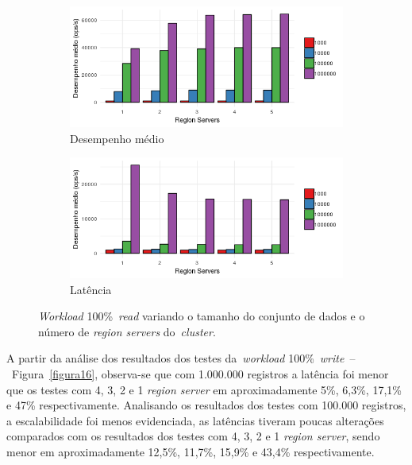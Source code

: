\documentclass[12pt]{article}
\begin{document}
\begin{figure}[!ht]
    \centering
    \begin{subfigure}[b]{0.49\textwidth}
        \centering
        \includegraphics[width=\textwidth]{images/figura17}
        \caption{Desempenho médio}
        \label{figura17}
    \end{subfigure}
        \hfill
    \begin{subfigure}[b]{0.49\textwidth}  
        \centering 
        \includegraphics[width=\textwidth]{images/figura18}
        \caption{Latência}%
        \label{figura18}
    \end{subfigure}
    \caption{\emph{Workload} 100\%~\emph{read} variando o tamanho do conjunto de dados e o número de \emph{region servers} do~\emph{cluster}.}
\end{figure}

A partir da análise dos resultados dos testes da~\emph{workload} 100\%~\emph{write}~--~Figura~\ref{figura16}, observa-se que com 1.000.000 registros a latência foi menor que os testes com 4, 3, 2 e 1 \emph{region server} em aproximadamente 5\%, 6,3\%, 17,1\% e 47\% respectivamente. 
Analisando os resultados dos testes com 100.000 registros, a escalabilidade foi menos evidenciada, as latências tiveram poucas alterações comparados com os resultados dos testes com 4, 3, 2 e 1 \emph{region server}, sendo menor em aproximadamente 12,5\%, 11,7\%, 15,9\% e 43,4\% respectivamente.
\end{document}
